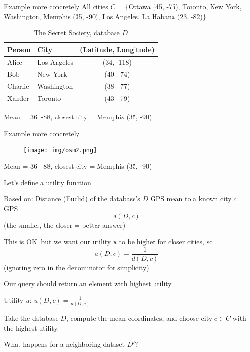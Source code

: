 \documentclass[12pt,aspectratio=169,handout]{beamer}
\begin{document}
\begin{frame}{Example more concretely}
All cities $C$ = \{Ottawa (45, -75), Toronto, New York, Washington, Memphis (35, -90), Los Angeles, La Habana (23, -82)\}

\begin{table}
\scriptsize
\begin{tabular}{llc}
\toprule
Person & City & (Latitude, Longitude)\\ \midrule
Alice & Los Angeles & (34, -118) \\
Bob & New York & (40, -74) \\
Charlie & Washington & (38, -77) \\
Xander & Toronto & (43, -79) \\ \bottomrule
\end{tabular}
\caption{The Secret Society, database $D$}
\end{table}

Mean = 36, -88, closest city = Memphis (35, -90)

\end{frame}


\begin{frame}{Example more concretely}

\begin{figure}
\texttt{[image: img/osm2.png]}
\end{figure}
Mean = 36, -88, closest city = Memphis (35, -90)

\end{frame}

\begin{frame}{Let's define a utility function}

Based on: Distance (Euclid) of the database's $D$ GPS mean to a known city $c$ GPS
$$d(D, c)$$
(the smaller, the closer = better answer)

This is OK, but we want our utility $u$ to be higher for closer cities, so
$$
u(D, c) = \frac{1}{d(D, c)}
$$
(ignoring zero in the denominator for simplicity)

\end{frame}


\begin{frame}{Our query should return an element with highest utility}

Utility $u$: $u(D, c) = \frac{1}{d(D, c)}$

Take the database $D$, compute the mean coordinates, and choose city $c \in C$ with the highest utility.

What happens for a neighboring dataset $D'$?
\end{frame}
\end{document}
